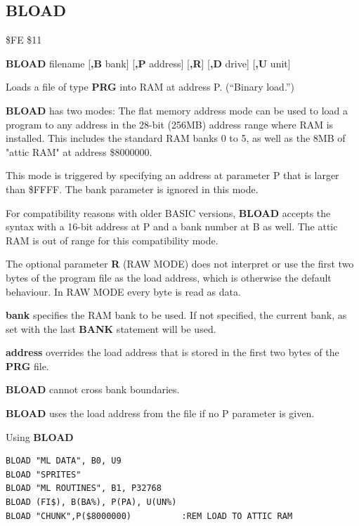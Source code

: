 
\newpage
\subsection{BLOAD}
\begin{description}[leftmargin=2cm,style=nextline]
\item [Token:] \$FE \$11
\item [Format:] {\bf BLOAD} filename [{\bf,B} bank] [{\bf,P} address] [{\bf,R}]
		[{\bf,D} drive] [{\bf,U} unit]
\item [Usage:]
   Loads a file of type {\bf PRG} into RAM at address P. (``Binary load.'')

   {\bf BLOAD} has two modes:
   The flat memory address mode can be used to load a program to any
   address in the 28-bit (256MB) address range where RAM is installed.
   This includes the standard RAM banks 0 to 5, as well as
   the 8MB of "attic RAM" at address \$8000000.

   This mode is triggered by specifying an address at parameter P
   that is larger than \$FFFF. The bank parameter is ignored in this mode.

   For compatibility reasons with older BASIC versions, {\bf BLOAD}
   accepts the syntax with a 16-bit address at P and a bank number at B as well.
   The attic RAM is out of range for this compatibility mode.

   The optional parameter {\bf R} (RAW MODE) does not interpret or use the
   first two bytes of the program file as the load address, which is otherwise the
   default behaviour. In RAW MODE every byte is read as data.

   \filenamedefinition

   {\bf bank} specifies the RAM bank to be used.
   If not specified, the current bank, as set with the last
   {\bf BANK} statement will be used.

   {\bf address} overrides the load address
   that is stored in the first two bytes of the {\bf PRG} file.

   \drivedefinition

   \unitdefinition

\item [Remarks:]
   {\bf BLOAD} cannot cross bank boundaries.

{\bf BLOAD} uses the load address from the file if no P parameter is given.

\item [Examples:] Using {\bf BLOAD}
\begin{tcolorbox}[colback=black,coltext=white]
\verbatimfont{\codefont}
\begin{verbatim}
BLOAD "ML DATA", B0, U9
BLOAD "SPRITES"
BLOAD "ML ROUTINES", B1, P32768
BLOAD (FI$), B(BA%), P(PA), U(UN%)
BLOAD "CHUNK",P($8000000)          :REM LOAD TO ATTIC RAM
\end{verbatim}
\end{tcolorbox}
\end{description}

